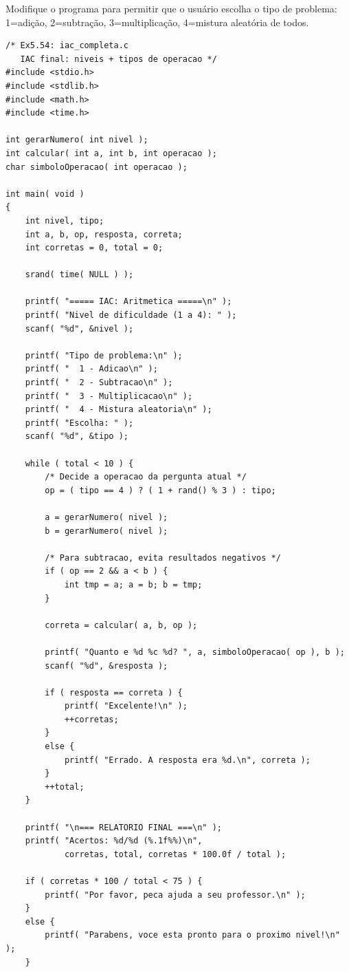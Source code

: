 \documentclass[12pt,a4paper]{article}
\begin{document}
\begin{enunciadoBox}[Enunciado 5.54]
Modifique o programa para permitir que o usuário escolha o tipo de problema:
1=adição, 2=subtração, 3=multiplicação, 4=mistura aleatória de todos.
\end{enunciadoBox}

\begin{respostabox}
\begin{lstlisting}
/* Ex5.54: iac_completa.c
   IAC final: niveis + tipos de operacao */
#include <stdio.h>
#include <stdlib.h>
#include <math.h>
#include <time.h>

int gerarNumero( int nivel );
int calcular( int a, int b, int operacao );
char simboloOperacao( int operacao );

int main( void )
{
    int nivel, tipo;
    int a, b, op, resposta, correta;
    int corretas = 0, total = 0;

    srand( time( NULL ) );

    printf( "===== IAC: Aritmetica =====\n" );
    printf( "Nivel de dificuldade (1 a 4): " );
    scanf( "%d", &nivel );

    printf( "Tipo de problema:\n" );
    printf( "  1 - Adicao\n" );
    printf( "  2 - Subtracao\n" );
    printf( "  3 - Multiplicacao\n" );
    printf( "  4 - Mistura aleatoria\n" );
    printf( "Escolha: " );
    scanf( "%d", &tipo );

    while ( total < 10 ) {
        /* Decide a operacao da pergunta atual */
        op = ( tipo == 4 ) ? ( 1 + rand() % 3 ) : tipo;

        a = gerarNumero( nivel );
        b = gerarNumero( nivel );

        /* Para subtracao, evita resultados negativos */
        if ( op == 2 && a < b ) {
            int tmp = a; a = b; b = tmp;
        }

        correta = calcular( a, b, op );

        printf( "Quanto e %d %c %d? ", a, simboloOperacao( op ), b );
        scanf( "%d", &resposta );

        if ( resposta == correta ) {
            printf( "Excelente!\n" );
            ++corretas;
        }
        else {
            printf( "Errado. A resposta era %d.\n", correta );
        }
        ++total;
    }

    printf( "\n=== RELATORIO FINAL ===\n" );
    printf( "Acertos: %d/%d (%.1f%%)\n",
            corretas, total, corretas * 100.0f / total );

    if ( corretas * 100 / total < 75 ) {
        printf( "Por favor, peca ajuda a seu professor.\n" );
    }
    else {
        printf( "Parabens, voce esta pronto para o proximo nivel!\n" );
    }


\end{lstlisting}
\end{respostabox}
\end{document}

